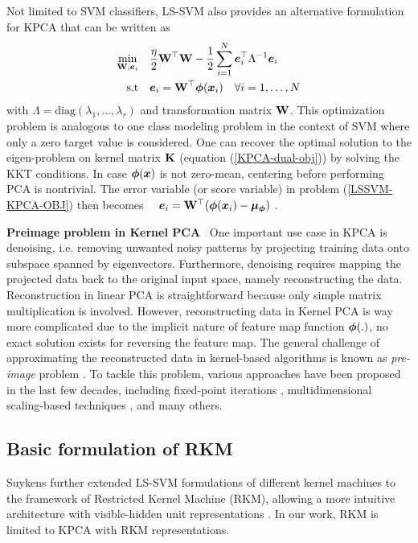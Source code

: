 Not limited to SVM classifiers, LS-SVM also provides an alternative formulation for KPCA that can be written as
\begin{equation}
    \begin{aligned}
            \min_{\mathbf{W}, \boldsymbol{e}_i}& \quad \frac{\eta}{2}\mathbf{W}^\top\mathbf{W} - \frac{1}{2}\sum_{i=1}^{N}\boldsymbol{e}_{i}^\top \Lambda^{-1} \boldsymbol{e}_{i}  \\
    \text{s.t}& \quad \boldsymbol{e}_i = \mathbf{W}^\top \boldsymbol{\phi}(\boldsymbol{x}_i) \quad \forall i =1,\dots,N
    \label{LSSVM-KPCA-OBJ}
    \end{aligned}
\end{equation}
with $\Lambda = \text{diag}(\lambda_1,\dots,\lambda_r)$ and transformation matrix $\mathbf{W}$. This optimization problem is analogous to one class modeling problem in the context of SVM where only a zero target value is considered. One can recover the optimal solution to the eigen-problem on kernel matrix $\mathbf{K}$ (equation (\ref{KPCA-dual-obj})) by solving the KKT conditions. In case $\boldsymbol{\phi}(\boldsymbol{x})$ is not zero-mean, centering before performing PCA is nontrivial. The error variable (or score variable) in problem (\ref{LSSVM-KPCA-OBJ}) then becomes $\quad \boldsymbol{e}_i = \mathbf{W}^\top (\boldsymbol{\phi}(\boldsymbol{x}_i) - \boldsymbol{\mu_{\boldsymbol{\phi}}})$ \cite{suykensLeastSquaresSupport2002}.


\noindent\textbf{Preimage problem in Kernel PCA} \ One important use case in KPCA is denoising, i.e. removing unwanted noisy patterns by projecting training data onto subspace spanned by eigenvectors. Furthermore, denoising requires mapping the projected data back to the original input space, namely reconstructing the data. Reconstruction in linear PCA is straightforward because only simple matrix multiplication is involved. However, reconstructing data in Kernel PCA is way more complicated due to the implicit nature of feature map function $\boldsymbol{\phi}(.)$, no exact solution exists for reversing the feature map. The general challenge of approximating the reconstructed data in kernel-based algorithms is known as \emph{pre-image} problem \cite{honeinePreimageProblemKernelBased2011, mikaKernelPCADeNoising1998a}. To tackle this problem, various approaches have been proposed in the last few decades, including fixed-point iterations \cite{mikaKernelPCADeNoising1998a}, multidimensional scaling-based techniques \cite{kwokPreimageProblemKernel2004a}, and many others.

\subsection{Basic formulation of RKM}
\label{subsec-basicformulaRKM}
Suykens further extended LS-SVM formulations of different kernel machines to the framework of Restricted Kernel Machine (RKM), allowing a more intuitive architecture with visible-hidden unit representations \cite{suykensDeepRestrictedKernel2017}. In our work, RKM is limited to KPCA with RKM representations.

